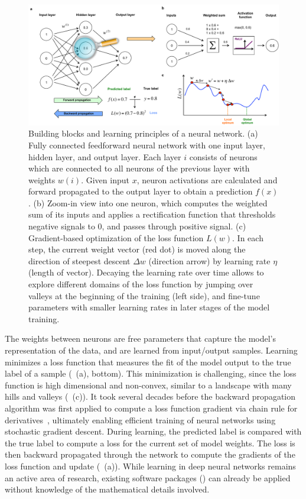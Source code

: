 \begin{figure}[htbp!]
\centering
\includegraphics[width=1.0\textwidth]{ann}
\caption[Building blocks and learning principles of a neural network.]{Building blocks and learning principles of a neural network. (a) Fully connected feedforward neural network with one input layer, hidden layer, and output layer.  Each layer $i$ consists of neurons which are connected to all neurons of the previous layer with weights $w(i)$. Given input $x$, neuron activations are calculated and forward propagated to the output layer to obtain a prediction $f(x)$. (b) Zoom-in view into one neuron, which computes the weighted sum of its inputs and applies a rectification function that thresholds negative signals to $0$, and passes through positive signal. (c) Gradient-based optimization of the loss function $L(w)$. In each step, the current weight vector (red dot) is moved along the direction of steepest descent $\Delta w$ (direction arrow) by learning rate $\eta$ (length of vector). Decaying the learning rate over time allows to explore different domains of the loss function by jumping over valleys at the beginning of the training (left side), and fine-tune parameters with smaller learning rates in later stages of the model training.}
\label{fig:dl_ann}
\end{figure}

The weights between neurons are free parameters that capture the model's representation of the data, and are learned from input/output samples. Learning minimizes a loss function that measures the fit of the model output to the true label of a sample (~(a), bottom). This minimization is challenging, since the loss function is high dimensional and non-convex, similar to a landscape with many hills and valleys (~(c)). It took several decades before the backward propagation algorithm was first applied to compute a loss function gradient via chain rule for derivatives~\citep{rumelhart_learning_1988}, ultimately enabling efficient training of neural networks using stochastic gradient descent. During learning, the predicted label is compared with the true label to compute a loss for the current set of model weights. The loss is then backward propagated through the network to compute the gradients of the loss function and update (~(a)). While learning in deep neural networks remains an active area of research, existing software packages () can already be applied without knowledge of the mathematical details involved.

